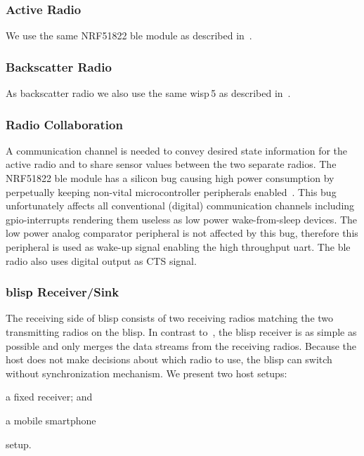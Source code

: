\documentclass[conference,letterpaper,twoside,final,10pt]{IEEEtran}
\begin{document}
\subsubsection{Active Radio}
\label{sec:blisp/ble}

We use the same NRF51822 \ac{ble} module as described in~.

\subsubsection{Backscatter Radio}
\label{sec:blisp/wisp}

As backscatter radio we also use the same \ac{wisp}\,5 as described in~.

\subsubsection{Radio Collaboration}
\label{sec:blisp/collaboration}

A communication channel is needed to convey desired state information for the active radio and to share sensor values between the two separate radios.
The NRF51822 \ac{ble} module has a silicon bug causing high power consumption by perpetually keeping non-vital microcontroller peripherals enabled~\cite[Id 39]{nordic2013pan2}.
This bug unfortunately affects all conventional (digital) communication channels including \ac{gpio}-interrupts rendering them useless as low power wake-from-sleep devices.
The low power analog comparator peripheral is not affected by this bug, therefore this peripheral is used as wake-up signal enabling the high throughput \ac{uart}. 
The \ac{ble} radio also uses digital output as CTS signal.

\subsubsection{\acs{blisp} Receiver/Sink}
\label{sec:blisp/sink}

The receiving side of \ac{blisp} consists of two receiving radios matching the two transmitting radios on the \ac{blisp}.
In contrast to~\cite{gummeson2010jsac}, the \ac{blisp} receiver is as simple as possible and only merges the data streams from the receiving radios.
Because the host does not make decisions about which radio to use, the \ac{blisp} can switch without synchronization mechanism.
We present two host setups:
\begin{enumerate*}[label=(\roman*)]
	\item 	a fixed receiver; and
	\item 	a mobile smartphone
\end{enumerate*}
setup.
\end{document}

